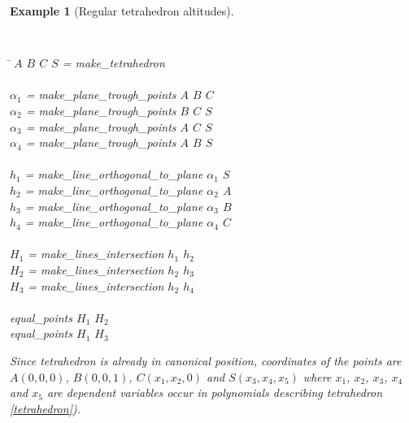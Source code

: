 \documentclass[final,1p,times,authoryear]{elsarticle}
\newtheorem{example}[theorem]{Example}
\begin{document}
\begin{example}[Regular tetrahedron altitudes]
\begin{footnotesize}
{\tt
\begin{tabbing}
\hspace{5mm}\=\kill
\> $A$ $B$ $C$ $S$ = make\_tetrahedron\\
 \\
\> $\alpha_1$ = make\_plane\_trough\_points $A$ $B$ $C$ \\
\> $\alpha_2$ = make\_plane\_trough\_points $B$ $C$ $S$ \\
\> $\alpha_3$ = make\_plane\_trough\_points $A$ $C$ $S$ \\
\> $\alpha_4$ = make\_plane\_trough\_points $A$ $B$ $S$ \\
 \\
\> $h_1$ = make\_line\_orthogonal\_to\_plane $\alpha_1$ $S$ \\
\> $h_2$ = make\_line\_orthogonal\_to\_plane $\alpha_2$ $A$ \\
\> $h_3$ = make\_line\_orthogonal\_to\_plane $\alpha_3$ $B$ \\
\> $h_4$ = make\_line\_orthogonal\_to\_plane $\alpha_4$ $C$ \\
 \\
\> $H_1$ = make\_lines\_intersection $h_1$ $h_2$ \\
\> $H_2$ = make\_lines\_intersection $h_2$ $h_3$ \\
\> $H_3$ = make\_lines\_intersection $h_2$ $h_4$ \\
 \\
\>equal\_points $H_1$ $H_2$ \\
\>equal\_points $H_1$ $H_3$ \\
\end{tabbing}
}
\end{footnotesize}

Since tetrahedron is already in canonical position, coordinates of the
points are $A(0, 0, 0)$, $B(0, 0, 1)$, $C(x_1, x_2, 0)$ and
$S(x_3, x_4, x_5)$ where $x_1$, $x_2$, $x_3$, $x_4$ and $x_5$ are
dependent variables occur in polynomials describing tetrahedron
\ref{tetrahedron}).



\end{example}
\end{document}
